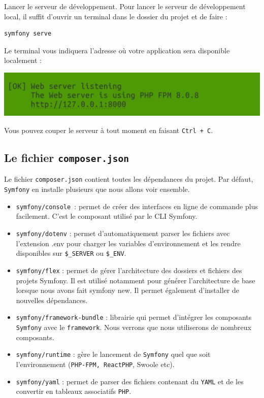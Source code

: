 \documentclass{article}
\begin{document}
Lancer le serveur de développement. Pour lancer le serveur de développement local, il suffit d'ouvrir un terminal dans le dossier du projet et de faire :


\begin{verbatim}
symfony serve
\end{verbatim}
Le terminal vous indiquera l'adresse où votre application sera disponible localement :
\begin{center}
\includegraphics[width=15cm]{images/image3.png}
\end{center}

Vous pouvez couper le serveur à tout moment en faisant {\tt Ctrl + C}.

\subsection{Le fichier {\tt composer.json}}
Le fichier {\tt composer.json} contient toutes les dépendances du projet. Par défaut, {\tt Symfony} en installe plusieurs que nous allons voir ensemble.

\begin{itemize}

\item {\tt symfony/console }: permet de créer des interfaces en ligne de commande plus facilement. C'est le composant utilisé par le CLI Symfony.

\item {\tt symfony/dotenv} : permet d'automatiquement parser les fichiers avec l'extension .env pour charger les variables d'environnement et les rendre disponibles sur {\tt \$\_SERVER} ou {\tt \$\_ENV}.

\item {\tt symfony/flex} : permet de gérer l'architecture des dossiers et fichiers des projets Symfony. Il est utilisé notamment pour générer l'architecture de base lorsque nous avons fait symfony new. Il permet également d'installer de nouvelles dépendances.

\item {\tt symfony/framework-bundle} : librairie qui permet d'intégrer les composants {\tt Symfony} avec le {\tt framework}. Nous verrons que nous utiliserons de nombreux composants.

\item {\tt symfony/runtime} : gère le lancement de {\tt Symfony} quel que soit l'environnement ({\tt PHP-FPM, ReactPHP}, Swoole etc).

\item {\tt symfony/yaml} : permet de parser des fichiers contenant du {\tt YAML} et de les convertir en tableaux associatifs {\tt PHP}.
\end{itemize}
\end{document}
